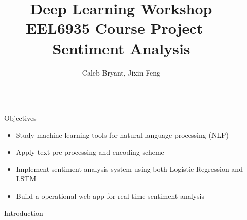 \documentclass[final]{beamer}
\title{Deep Learning Workshop\\
    EEL6935 Course Project -- Sentiment Analysis} %
\author{Caleb Bryant, Jixin Feng} %
\institute{University of Florida} %
\newlength{\sepwid}
\newlength{\onecolwid}
\begin{document}

\setlength{\belowcaptionskip}{2ex} %
\setlength\belowdisplayshortskip{2ex} %

\begin{frame}[t] %

\begin{columns}[t] %

\begin{column}{\sepwid}\end{column} %

\begin{column}{\onecolwid} %


\begin{alertblock}{Objectives}

\begin{itemize}
    \item Study machine learning tools for natural language processing (NLP)
    \item Apply text pre-processing and encoding scheme
    \item Implement sentiment analysis system using both Logistic Regression and LSTM
    \item Build a operational web app for real time sentiment analysis
\end{itemize}

\end{alertblock}


\begin{block}{Introduction}


\end{block}
\end{column}
\end{columns}
\end{frame}
\end{document}
